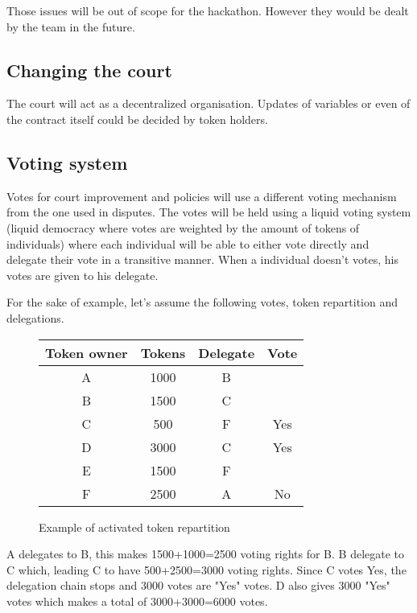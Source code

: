 \documentclass[12 pt]{article}
\begin{document}
Those issues will be out of scope for the hackathon. However they would be dealt by the team in the future.


\subsection{Changing the court}
The court will act as a decentralized organisation. Updates of variables or even of the contract itself could be decided by token holders.

\subsection{Voting system}
\label{voting}
Votes for court improvement and policies will use a different voting mechanism from the one used in disputes.
The votes will be held using a liquid voting system (liquid democracy\cite{liqdem} where votes are weighted by the amount of tokens of individuals) where each individual will be able to either vote directly and delegate their vote in a transitive manner.
When a individual doesn't votes, his votes are given to his delegate.

For the sake of example, let's assume the following votes, token repartition and delegations.

\begin{figure}[h!]
\label{repartition}
\begin{center}
   \begin{tabular}{ | c | c | c | c |}
     \hline
     Token owner & Tokens & Delegate & Vote \\ \hline
     A & 1000 & B &   \\ \hline
     B & 1500 & C &   \\ \hline
     C & 500  & F & Yes \\ \hline
     D & 3000 & C & Yes  \\ \hline
     E & 1500 & F &   \\ \hline
     F & 2500 & A & No \\ \hline
   \end{tabular}
 \end{center}
   \caption{Example of activated token repartition}
\end{figure}

A delegates to B, this makes 1500+1000=2500 voting rights for B. B delegate to C which, leading C to have 500+2500=3000 voting rights. Since C votes Yes, the delegation chain stops and 3000 votes are "Yes" votes.
D also gives 3000 "Yes" votes which makes a total of 3000+3000=6000 votes.
\end{document}
